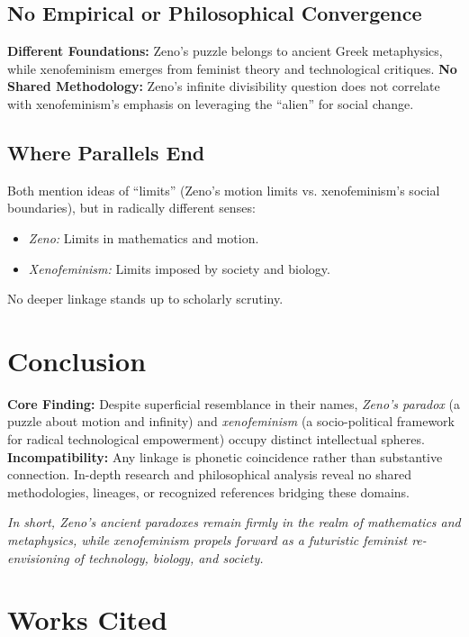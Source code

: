 \documentclass[12pt]{article}
\begin{document}
\subsection{No Empirical or Philosophical Convergence}

\textbf{Different Foundations:} Zeno’s puzzle belongs to ancient Greek metaphysics, while xenofeminism emerges from feminist theory and technological critiques.  
\textbf{No Shared Methodology:} Zeno’s infinite divisibility question does not correlate with xenofeminism’s emphasis on leveraging the ``alien'' for social change.

\subsection{Where Parallels End}

Both mention ideas of ``limits'' (Zeno’s motion limits vs. xenofeminism’s social boundaries), but in radically different senses:
\begin{itemize}
    \item \textit{Zeno:} Limits in mathematics and motion.
    \item \textit{Xenofeminism:} Limits imposed by society and biology.
\end{itemize}
No deeper linkage stands up to scholarly scrutiny.

\section{Conclusion}

\textbf{Core Finding:} Despite superficial resemblance in their names, \textit{Zeno’s paradox} (a puzzle about motion and infinity) and \textit{xenofeminism} (a socio-political framework for radical technological empowerment) occupy distinct intellectual spheres.  
\textbf{Incompatibility:} Any linkage is phonetic coincidence rather than substantive connection. In-depth research and philosophical analysis reveal no shared methodologies, lineages, or recognized references bridging these domains.

\vspace{1em}
\noindent
\textit{In short, Zeno’s ancient paradoxes remain firmly in the realm of mathematics and metaphysics, while xenofeminism propels forward as a futuristic feminist re-envisioning of technology, biology, and society.}

\section*{Works Cited}
\end{document}

